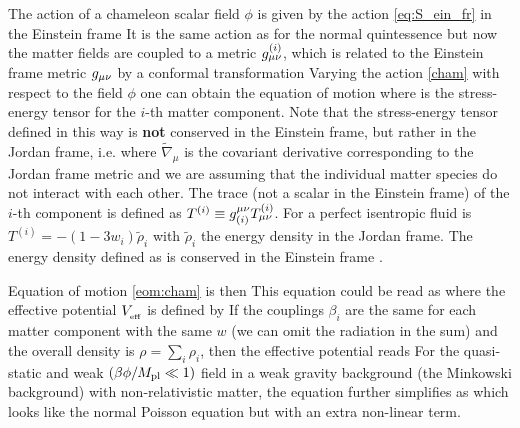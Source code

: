 The action of a chameleon scalar field $\phi$ is given by the action \eqref{eq:S_ein_fr} in the Einstein frame
It is the same action as for the normal quintessence but now the matter fields are coupled to a metric $g_{\mu\nu}^{(i)}$, which is related to the Einstein frame metric $g_{\mu\nu}$ by a conformal transformation
Varying the action \eqref{cham} with respect to the field $\phi$ one can obtain the equation of motion
where
is the stress-energy tensor for the $i$-th matter component. Note that the stress-energy tensor defined in this way is \textbf{not} conserved in the Einstein frame, but rather in the Jordan frame, i.e.
where $\tilde{\nabla}_\mu$ is the covariant derivative corresponding to the Jordan frame metric and we are assuming that the individual matter species do not interact with each other. The trace (not a scalar in the Einstein frame) of the $i$-th component is defined as $T^{(i)}\equiv g^{\mu\nu}_{(i)}T^{(i)}_{\mu\nu}$. For a perfect isentropic fluid is $T^{(i)}=-(1-3w_i)\tilde{\rho}_i$ with $\tilde{\rho}_i$ the energy density in the Jordan frame. The energy density defined as
is conserved in the Einstein frame \parencite{Waterhouse:2006wv}.

Equation of motion \eqref{eom:cham} is then
This equation could be read as
where the effective potential $V_{_\text{\tiny eff}}$ is defined by
If the couplings $\beta_i$ are the same for each matter component with the same $w$ (we can omit the radiation in the sum) and the overall density is $\rho=\sum_i\rho_i$, then the effective potential reads
For the quasi-static and weak $(\beta\phi/M_{\text{\scriptsize pl}}\ll1)$ field in a weak gravity background (the Minkowski background) with non-relativistic matter, the equation further simplifies as
which looks like the normal Poisson equation but with an extra non-linear term.
